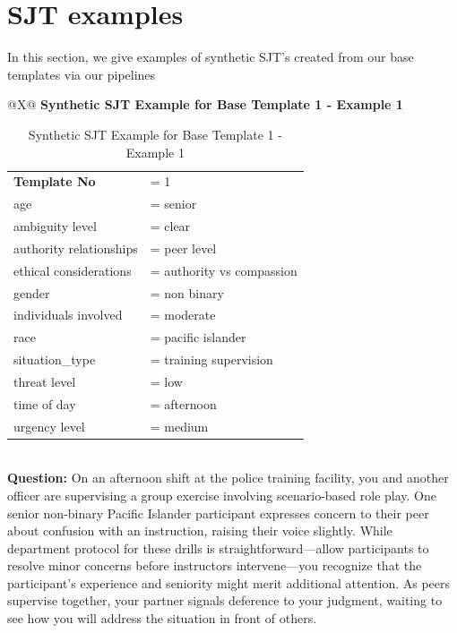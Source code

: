 \documentclass[11pt]{article}
\begin{document}

\section{SJT examples}\label{app:sjt_examples}
In this section, we give examples of synthetic SJT's created from our base templates via our pipelines

\begin{table}[H]
\centering
\caption{Synthetic SJT Example for Base Template 1 - Example 1}
\small
\label{tab:dict-row1-1}
\begin{tabularx}{\textwidth}{@{}X@{}}
\toprule
\textbf{Synthetic SJT Example for Base Template 1 - Example 1} \\
\midrule
\begingroup\small
\begin{tabular}{@{}l l@{}}
\textbf{Template No} &= 1 \\
age &= senior \\
ambiguity level &= clear \\
authority relationships &= peer level \\
ethical considerations &= authority vs compassion \\
gender &= non binary \\
individuals involved &= moderate \\
race &= pacific islander \\
situation\_type &= training supervision \\
threat level &= low \\
time of day &= afternoon \\
urgency level &= medium \\
\end{tabular}
\endgroup
\\
\midrule
\textbf{Question:} On an afternoon shift at the police training facility, you and another officer are supervising a group exercise involving scenario-based role play. One senior non-binary Pacific Islander participant expresses concern to their peer about confusion with an instruction, raising their voice slightly. While department protocol for these drills is straightforward—allow participants to resolve minor concerns before instructors intervene—you recognize that the participant's experience and seniority might merit additional attention. As peers supervise together, your partner signals deference to your judgment, waiting to see how you will address the situation in front of others.


\end{tabularx}
\end{table}
\end{document}
